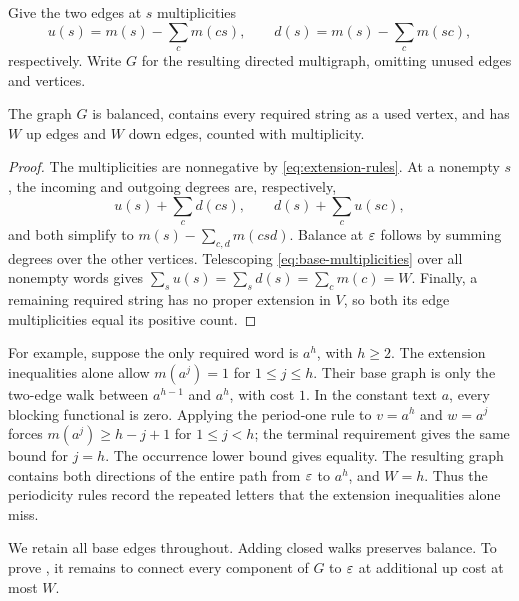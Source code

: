 Give the two edges at $s$ multiplicities
\begin{equation}\label{eq:base-multiplicities}
u(s)=m(s)-\sum_c m(cs),\qquad
d(s)=m(s)-\sum_c m(sc),
\end{equation}
respectively. Write $G$ for the resulting directed multigraph, omitting unused edges and vertices.

\begin{lemma}\label{lem:base}
The graph $G$ is balanced, contains every required string as a used vertex, and has $W$ up edges and $W$ down edges, counted with multiplicity.
\end{lemma}

\begin{proof}
The multiplicities are nonnegative by \eqref{eq:extension-rules}. At a nonempty $s$, the incoming and outgoing degrees are, respectively,
\[
u(s)+\sum_c d(cs),\qquad d(s)+\sum_c u(sc),
\]
and both simplify to $m(s)-\sum_{c,d}m(csd)$. Balance at $\varepsilon$ follows by summing degrees over the other vertices. Telescoping \eqref{eq:base-multiplicities} over all nonempty words gives $\sum_s u(s)=\sum_s d(s)=\sum_c m(c)=W$. Finally, a remaining required string has no proper extension in $V$, so both its edge multiplicities equal its positive count.
\end{proof}

For example, suppose the only required word is $a^h$, with $h\ge2$. The extension inequalities alone allow $m(a^j)=1$ for $1\le j\le h$. Their base graph is only the two-edge walk between $a^{h-1}$ and $a^h$, with cost $1$. In the constant text $a$, every blocking functional is zero. Applying the period-one rule to $v=a^h$ and $w=a^j$ forces $m(a^j)\ge h-j+1$ for $1\le j<h$; the terminal requirement gives the same bound for $j=h$. The occurrence lower bound gives equality. The resulting graph contains both directions of the entire path from $\varepsilon$ to $a^h$, and $W=h$. Thus the periodicity rules record the repeated letters that the extension inequalities alone miss.

We retain all base edges throughout. Adding closed walks preserves balance. To prove , it remains to connect every component of $G$ to $\varepsilon$ at additional up cost at most $W$.
